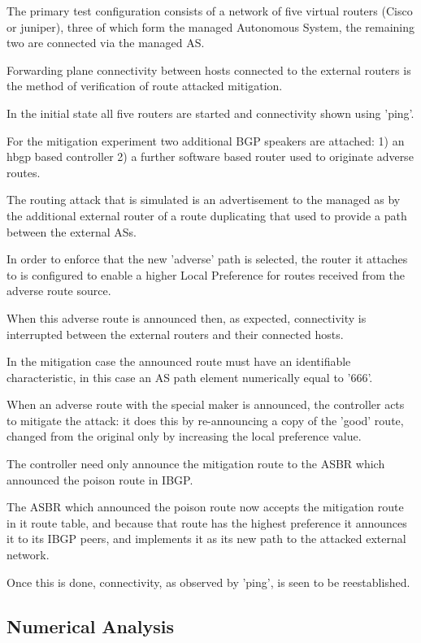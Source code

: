 The primary test configuration consists of a network of five virtual routers (Cisco or juniper), three of which form the managed Autonomous System, the remaining two are connected via the managed AS.

Forwarding plane connectivity between hosts connected to the external routers is the method of verification of route attacked mitigation.

In the initial state all five routers are started and connectivity shown using 'ping'.

For the mitigation experiment two additional BGP speakers are attached:
1) an hbgp based controller
2) a further software based router used to originate adverse routes.

The routing attack that is simulated is an advertisement to the managed as by the additional external router of a route duplicating that used to provide a path between the external ASs.

In order to enforce that the new 'adverse' path is selected, the router it attaches to is configured to enable a higher Local Preference for routes received from the adverse route source.

When this adverse route is announced then, as expected, connectivity is interrupted between the external routers and their connected hosts.

In the mitigation case the announced route must have an identifiable characteristic, in this case an AS path element numerically equal to '666'.

When an adverse route with the special maker is announced, the controller acts to mitigate the attack: it does this by re-announcing a copy of the 'good' route, changed from the original only by increasing the local preference value.

The controller need only announce the mitigation route to the ASBR which announced the poison route in IBGP.

The ASBR which announced the poison route now accepts the mitigation route in it route table, and because that route has the highest preference it announces it to its IBGP peers, and implements it as its new path to the attacked external network.

Once this is done, connectivity, as observed by 'ping', is seen to be reestablished.

\subsection{Numerical Analysis}

